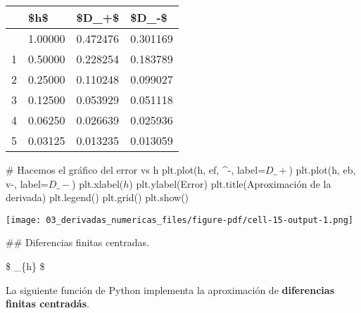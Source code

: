 \documentclass[
  letterpaper,
  DIV=11,
  numbers=noendperiod]{scrreprt}
\newenvironment{Shaded}{\begin{snugshade}}{\end{snugshade}}
\newcommand{\CommentTok}[1]{\textcolor[rgb]{0.37,0.37,0.37}{#1}}
\newcommand{\NormalTok}[1]{\textcolor[rgb]{0.00,0.23,0.31}{#1}}
\newcommand{\OperatorTok}[1]{\textcolor[rgb]{0.37,0.37,0.37}{#1}}
\newcommand{\StringTok}[1]{\textcolor[rgb]{0.13,0.47,0.30}{#1}}
\begin{document}
\begin{longtable}[]{@{}llll@{}}
\toprule\noalign{}
& \$h\$ & \$D\_+\$ & \$D\_-\$ \\
\midrule\noalign{}
\endhead
\bottomrule\noalign{}
\endlastfoot
0 & 1.00000 & 0.472476 & 0.301169 \\
1 & 0.50000 & 0.228254 & 0.183789 \\
2 & 0.25000 & 0.110248 & 0.099027 \\
3 & 0.12500 & 0.053929 & 0.051118 \\
4 & 0.06250 & 0.026639 & 0.025936 \\
5 & 0.03125 & 0.013235 & 0.013059 \\
\end{longtable}

\begin{Shaded}
\begin{Highlighting}[]
\CommentTok{\# Hacemos el gráfico del error vs h}
\NormalTok{plt.plot(h, ef, }\StringTok{\textquotesingle{}\^{}{-}\textquotesingle{}}\NormalTok{, label}\OperatorTok{=}\StringTok{\textquotesingle{}$D\_+$\textquotesingle{}}\NormalTok{)}
\NormalTok{plt.plot(h, eb, }\StringTok{\textquotesingle{}v{-}\textquotesingle{}}\NormalTok{, label}\OperatorTok{=}\StringTok{\textquotesingle{}$D\_{-}$\textquotesingle{}}\NormalTok{)}
\NormalTok{plt.xlabel(}\StringTok{\textquotesingle{}$h$\textquotesingle{}}\NormalTok{)}
\NormalTok{plt.ylabel(}\StringTok{\textquotesingle{}Error\textquotesingle{}}\NormalTok{)}
\NormalTok{plt.title(}\StringTok{\textquotesingle{}Aproximación de la derivada\textquotesingle{}}\NormalTok{)}
\NormalTok{plt.legend()}
\NormalTok{plt.grid()}
\NormalTok{plt.show()}
\end{Highlighting}
\end{Shaded}

\texttt{[image: 03\_derivadas\_numericas\_files/figure-pdf/cell-15-output-1.png]}

\#\# Diferencias finitas centradas.

\$ \displaystyle {}
\approx \lim\limits\_\{h\}  \$

La siguiente función de Python implementa la aproximación de
\textbf{diferencias finitas centradás}.
\end{document}
